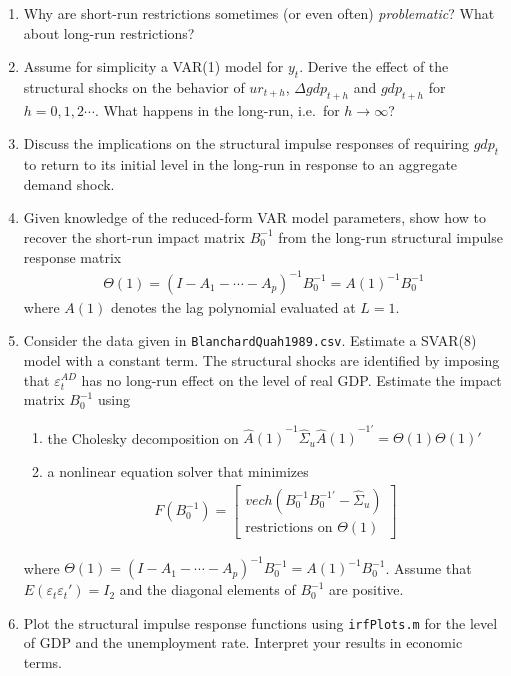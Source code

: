 \begin{enumerate}
\item Why are short-run restrictions sometimes (or even often) \emph{problematic}?
What about long-run restrictions?

\item Assume for simplicity a VAR(1) model for \(y_t\).
Derive the effect of the structural shocks on the behavior of \(ur_{t+h}\), \(\Delta gdp_{t+h}\) and \(gdp_{t+h}\) for \(h=0,1,2\cdots \).
What happens in the long-run, i.e.\ for \(h\rightarrow \infty \)?

\item Discuss the implications on the structural impulse responses of requiring \(gdp_t\) to return to its initial level in the long-run in response to an aggregate demand shock.

\item Given knowledge of the reduced-form VAR model parameters,
  show how to recover the short-run impact matrix \(B_0^{-1}\) from the long-run structural impulse response matrix
  \begin{align*}
  \Theta(1)={(I-A_1-\cdots -A_p)}^{-1}B_0^{-1} = {A(1)}^{-1}B_0^{-1}
  \end{align*} 
  where \(A(1)\) denotes the lag polynomial evaluated at \(L=1\).

\item Consider the data given in \texttt{BlanchardQuah1989.csv}.
Estimate a SVAR(8) model with a constant term.
The structural shocks are identified by imposing that \(\varepsilon_t^{AD}\) has no long-run effect on the level of real GDP\@.
Estimate the impact matrix \(B_0^{-1}\) using 
\begin{enumerate}
\item the Cholesky decomposition on \({\hat{A}(1)}^{-1} \hat{\Sigma}_u {\hat{A}(1)}^{-1'}= \Theta(1) \Theta(1)'\)

\item a nonlinear equation solver that minimizes
\begin{align*}
F(B_0^{-1}) = \begin{bmatrix}
vech(B_0^{-1}B_0^{-1'}-\hat{\Sigma}_u)\\
\text{restrictions on } \Theta(1)
\end{bmatrix}
\end{align*}

\end{enumerate}
where \(\Theta(1)={(I-A_1-\cdots -A_p)}^{-1}B_0^{-1} = {A(1)}^{-1}B_0^{-1}\).
Assume that \(E(\varepsilon_t\varepsilon_t')=I_2\) and the diagonal elements of \(B_0^{-1}\) are positive.

\item Plot the structural impulse response functions using \texttt{irfPlots.m} for the level of GDP and the unemployment rate.
Interpret your results in economic terms.
\end{enumerate}

